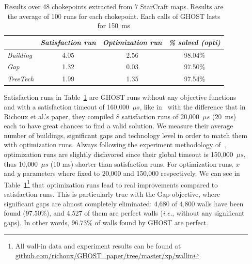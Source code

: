 \documentclass[journal]{IEEEtran}
\newcommand{\ghost}{\textsc{GHOST}\xspace}
\newcommand{\ie}{\textit{i.e.}}
\begin{document}
\begin{table}[ht]
  \caption{Results  over 48  chokepoints  extracted  from 7  StarCraft
    maps. Results  are the  average of 100  runs for  each chokepoint.
    Each calls of \ghost lasts for 150~ms}
    \label{tab:wall}
    \centering
    \begin{tabular}{|l|c|c|c|}
      \cline{2-4}
      \multicolumn{1}{c|}{}   &    {\em   Satisfaction    run}&   {\em
        Optimization run}& {\em \% solved (opti)} \\
      \hline
      {\em Building} & 4.05 & 2.56 & 98.04\% \\
      {\em Gap} & 1.32 & 0.03 & 97.50\% \\
      {\em TreeTech} & 1.99 & 1.35 & 97.54\% \\
      \hline
    \end{tabular}
\end{table}
Satisfaction runs in Table~\ref{tab:wall}  are \ghost runs without any
objective functions  and with  a satisfaction  timeout of  160,000~$\mu s$, like
in~\cite{RichouxUO14}  with the  difference that  in Richoux  et al.'s
paper, they  compiled 8 satisfaction runs  of 20,000~$\mu s$ (20~ms) each to  have great
chances to find  a valid solution. We measure their  average number of
buildings, significant  gaps and  technology level  in order  to match
them  with   optimization  runs.   Always  following   the  experiment
methodology  of~\cite{RichouxUO14},  optimization  runs  are  slightly
disfavored since their global timeout is 150,000~$\mu s$, thus 10,000~$\mu s$ (10 ms) shorter than satisfaction
runs. For optimization  runs, $x$ and $y$ parameters where
fixed   to    20,000   and   150,000    respectively.    We   can    see   in
Table~\ref{tab:wall}\footnote{All wall-in data  and experiment results
  can                   be                  found                   at
  \href{https://github.com/richoux/GHOST\_paper/tree/master/xp/wallin}{github.com/richoux/GHOST\_paper/tree/master/xp/wallin}}
that  optimization  runs  lead   to  real  improvements  compared  to
satisfaction runs. This  is particularly true with  the Gap objective,
where significant  gaps are  almost completely eliminated:
 4,680 of 4,800 walls have been found (97.50\%), and 4,527 of them
are perfect walls (\ie, without any significant gaps). In other words,
96.73\% of walls found by \ghost are perfect.
\end{document}
